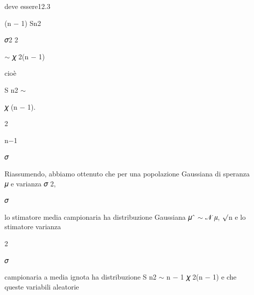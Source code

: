 \documentclass[a4paper,portrait,12pt]{article}
\begin{document}
\begin{flushleft}
deve essere12.3
\end{flushleft}


\begin{flushleft}
(n $-$ 1) Sn2
\end{flushleft}


\begin{flushleft}
𝜎2 2
\end{flushleft}


\begin{flushleft}
$\sim$ 𝜒 2(n $-$ 1)
\end{flushleft}


\begin{flushleft}
cio\`{e}
\end{flushleft}


\begin{flushleft}
S n2 $\sim$
\end{flushleft}


\begin{flushleft}
𝜒 (n $-$ 1).
\end{flushleft}


2


\begin{flushleft}
n$-$1
\end{flushleft}


\begin{flushleft}
𝜎
\end{flushleft}


\begin{flushleft}
Riassumendo, abbiamo ottenuto che per una popolazione Gaussiana di speranza 𝜇 e varianza 𝜎 2,
\end{flushleft}


\begin{flushleft}
𝜎
\end{flushleft}


\begin{flushleft}
lo stimatore media campionaria ha distribuzione Gaussiana 𝜇ˆ $\sim$ 𝒩 𝜇, $\surd$n e lo stimatore varianza
\end{flushleft}


2


\begin{flushleft}
𝜎
\end{flushleft}


\begin{flushleft}
campionaria a media ignota ha distribuzione S n2 $\sim$ n $-$ 1 𝜒 2(n $-$ 1) e che queste variabili aleatorie
\end{flushleft}
\end{document}
